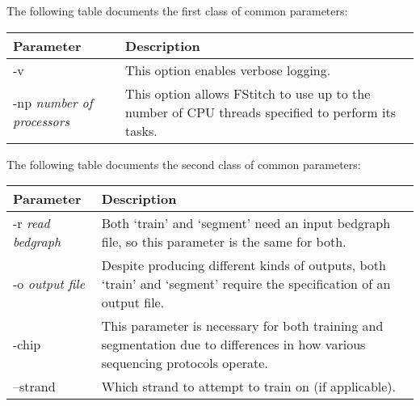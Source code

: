 \documentclass[12pt,letterpaper]{article}
\begin{document}
The following table documents the first class of common parameters:

\begin{tabular}{| p{5cm} | p{8cm} |}
 \hline
 \textbf{Parameter} & \textbf{Description}\\
 \hline
 -v & This option enables verbose logging.\\
 \hline
 -np \textit{number of processors} & This option allows FStitch to use up to the number of CPU threads specified to perform its tasks.\\
 \hline
\end{tabular}

The following table documents the second class of common parameters:

\begin{tabular} {| p{5cm} | p{8cm} |}
 \hline
 \textbf{Parameter} & \textbf{Description}\\
 \hline
 -r \textit{read bedgraph} & Both `train' and `segment' need an input bedgraph file, so this parameter is the same for both.\\
 \hline
 -o \textit{output file} & Despite producing different kinds of outputs, both `train' and `segment' require the specification of an output file.\\
 \hline
 -chip & This parameter is necessary for both training and segmentation due to differences in how various sequencing protocols operate.\\
 \hline
 --strand & Which strand to attempt to train on (if applicable).\\
 \hline
\end{tabular}
\end{document}
